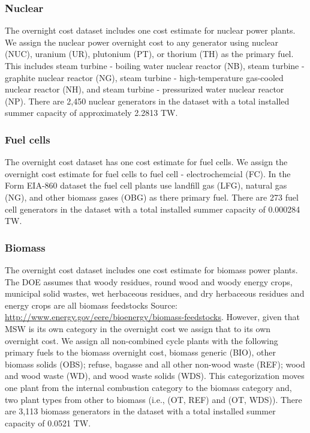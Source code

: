 \documentclass[10pt]{amsart}
\begin{document}
\subsubsection{Nuclear}
The overnight cost dataset includes one cost estimate for nuclear power plants.
We assign the nuclear power overnight cost to any generator using nuclear (NUC), uranium (UR), plutonium (PT), or thorium (TH) as the primary fuel.  
This includes steam turbine - boiling water nuclear reactor (NB), steam turbine - graphite nuclear reactor (NG), steam turbine - high-temperature gas-cooled nuclear reactor (NH), and steam turbine - pressurized water nuclear reactor (NP).
There are 2,450 nuclear generators in the dataset with a total installed summer capacity of approximately 2.2813 TW.

\subsubsection{Fuel cells}
The overnight cost dataset has one cost estimate for fuel cells.
We assign the overnight cost estimate for fuel cells to fuel cell - electrochemcial (FC). 
In the Form EIA-860 dataset the fuel cell plants use landfill gas (LFG), natural gas (NG), and other biomass gases (OBG) as there primary fuel. 
There are 273 fuel cell generators in the dataset with a total installed summer capacity of 0.000284 TW.

\subsubsection{Biomass}
The overnight cost dataset includes one cost estimate for biomass power plants. 
The DOE assumes that woody residues, round wood and woody energy crops, municipal solid wastes, wet herbaceous residues, and dry herbaceous residues and energy crops are all biomass feedstocks Source: \url{http://www.energy.gov/eere/bioenergy/biomass-feedstocks}. 
However, given that MSW is its own category in the overnight cost we assign that to its own overnight cost.
We assign all non-combined cycle plants with the following primary fuels to the biomass overnight cost, biomass generic (BIO), other biomass solids (OBS); refuse, bagasse and all other non-wood waste (REF); wood and wood waste (WD), and wood waste solids (WDS). 
This categorization moves one plant from the internal combustion category to the biomass category and, two plant types from other to biomass (i.e., (OT, REF) and (OT, WDS)). 
There are 3,113 biomass generators in the dataset with a total installed summer capacity of 0.0521 TW. 
\end{document}
